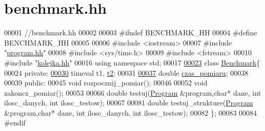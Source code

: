 \hypertarget{benchmark_8hh}{\section{benchmark.\-hh}
\label{benchmark_8hh}
}

\begin{DoxyCode}
00001 \textcolor{comment}{//benchmark.hh}
00002 
00003 \textcolor{preprocessor}{#ifndef BENCHMARK\_HH}
00004 \textcolor{preprocessor}{}\textcolor{preprocessor}{#define BENCHMARK\_HH}
00005 \textcolor{preprocessor}{}
00006 \textcolor{preprocessor}{#include <iostream>}
00007 \textcolor{preprocessor}{#include "\hyperlink{program_8hh}{program.hh}"}
00008 \textcolor{preprocessor}{#include <sys/time.h>}
00009 \textcolor{preprocessor}{#include <fstream>}
00010 \textcolor{preprocessor}{#include "\hyperlink{kolejka_8hh}{kolejka.hh}"}
00016 \textcolor{keyword}{using namespace }std;
00017 
\hypertarget{benchmark_8hh_source_l00023}{}\hyperlink{class_benchmark}{00023} \textcolor{keyword}{class }\hyperlink{class_benchmark}{Benchmark}\{
00024 \textcolor{keyword}{private}:
\hypertarget{benchmark_8hh_source_l00030}{}\hyperlink{class_benchmark_a2b145dd2458fea33d6df41f310058bec}{00030}   timeval t1, \hyperlink{class_benchmark_a2b145dd2458fea33d6df41f310058bec}{t2};
00031 
\hypertarget{benchmark_8hh_source_l00037}{}\hyperlink{class_benchmark_ab72b3cbe324970fd8c738f03718d52fc}{00037}   \textcolor{keywordtype}{double} \hyperlink{class_benchmark_ab72b3cbe324970fd8c738f03718d52fc}{czas\_pomiaru};
00038 
00039 \textcolor{keyword}{public}:
00045   \textcolor{keywordtype}{void} rozpocznij\_pomiar();
00046 
00052   \textcolor{keywordtype}{void} zakoncz\_pomiar();
00053 
00066   \textcolor{keywordtype}{double} testuj(\hyperlink{class_program}{Program} &program,\textcolor{keywordtype}{char}* dane, \textcolor{keywordtype}{int} ilosc\_danych, \textcolor{keywordtype}{int} ilosc\_testow);
00067 
00081   \textcolor{keywordtype}{double} testuj\_strukture(\hyperlink{class_program}{Program} &program,\textcolor{keywordtype}{char}* dane, \textcolor{keywordtype}{int} ilosc\_danych, \textcolor{keywordtype}{int} ilosc\_testow);
00082 \};
00083 
00084 \textcolor{preprocessor}{#endif}
\end{DoxyCode}
